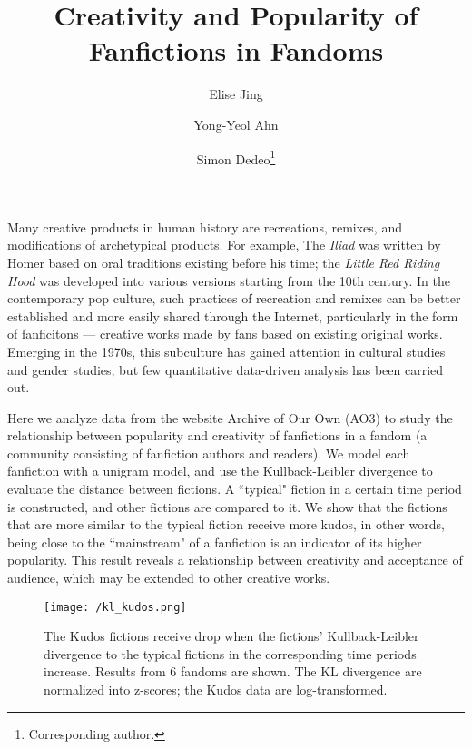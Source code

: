 \documentclass[11pt]{article} %
\begin{document}

\title{ \Large Creativity and Popularity of Fanfictions in Fandoms} %
\author[1]{Elise Jing}
\author[1]{Yong-Yeol Ahn}
\author[12]{Simon Dedeo\thanks{Corresponding author.} }
\date{\vspace{-4ex}}
\maketitle %


Many creative products in human history are recreations, remixes, and modifications of archetypical products. For example, The \emph{Iliad} was written by Homer based on oral traditions existing before his time; the \emph{Little Red Riding Hood} was developed into various versions starting from the 10th century. In the contemporary pop culture, such practices of recreation and remixes can be better established and more easily shared through the Internet, particularly in the form of fanficitons --- creative works made by fans based on existing original works. Emerging in the 1970s, this subculture has gained attention in cultural studies and gender studies, but few quantitative data-driven analysis has been carried out.

Here we analyze data from the website Archive of Our Own (AO3) to study the relationship between popularity and creativity of fanfictions in a fandom (a community consisting of fanfiction authors and readers). We model each fanfiction with a unigram model,  and use the Kullback-Leibler divergence to evaluate the distance between fictions. A ``typical" fiction in a certain time period is constructed, and other fictions are compared to it. We show that the fictions that are more similar to the typical fiction receive more kudos, in other words, being close to the ``mainstream" of a fanfiction is an indicator of its higher popularity. This result reveals a relationship between creativity and acceptance of audience, which may be extended to other creative works.

\begin{figure}[htbp]
\begin{center}
\texttt{[image: /kl\_kudos.png]}
\caption{The Kudos fictions receive drop when the fictions' Kullback-Leibler divergence to the typical fictions in the corresponding time periods increase. Results from 6 fandoms are shown. The KL divergence are normalized into z-scores; the Kudos data are log-transformed. }
\end{center}
\end{figure}

\printbibliography
    
\end{document}
